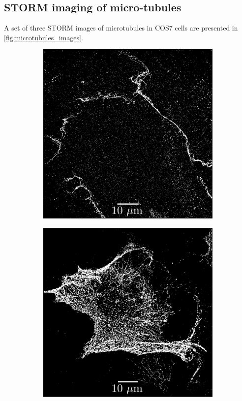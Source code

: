 \subsection{STORM imaging of micro-tubules}
A set of three STORM images of microtubules in COS7 cells are presented in \autoref{fig:microtubules_images}.
%
\begin{figure}
    \begin{subfigure}{0.32\textwidth}
        \includegraphics[width=\textwidth]{figures/microtubules_image1.png}
        \caption{}
        \label{fig:microtubules_image1}
    \end{subfigure}
    \begin{subfigure}{0.32\textwidth}
        \includegraphics[width=\textwidth]{figures/microtubules_image4.png}

\end{subfigure}
\end{figure}
